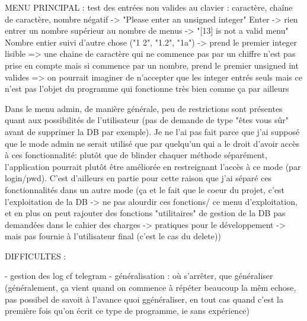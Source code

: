 \documentclass{article}
\begin{document}
MENU PRINCIPAL :
    test des entrées non valides au clavier : caractère, chaîne de caractère, nombre négatif -> "Please enter an unsigned integer"
    Enter -> rien
    entrer un nombre supérieur au nombre de menus -> "[13] is not a valid menu"
    Nombre entier suivi d'autre chose ("1 2", "1.2", "1a") -> prend le premier integer lisible
    => une chaine de caractère qui ne commence pas par un chiffre n'est pas prise en compte mais si commence par un nombre, prend le premier unsigned int valides
    => on pourrait imaginer de n'accepter que les integer entrés seuls mais ce n'est pas l'objet du programme qui fonctionne très bien comme ça par ailleurs

    Dans le menu admin, de manière générale, peu de restrictions sont présentes quant aux possibilités de l'utilisateur (pas de demande de type "êtes vous sûr" avant de supprimer la DB par exemple).
    Je ne l'ai pas fait parce que j'ai supposé que le mode admin ne serait utilisé que par quelqu'un qui a le droit d'avoir accès à ces fonctionnalité: plutôt que de blinder chaquer méthode séparément, l'application pourrait plutôt être améliorée en restreignant l'accès à ce mode (par login/pwd). C'est d'ailleurs en partie pour cette raison que j'ai séparé ces fonctionnalités dans un autre mode (ça et le fait que le coeur du projet, c'est l'exploitation de la DB -> ne pas alourdir ces fonctions/ ce menu d'exploitation, et en plus on peut rajouter des fonctions "utilitaires" de gestion de la DB pas demandées dans le cahier des charges -> pratiques pour le développement -> mais pas fournie à l'utilisateur final (c'est le cas du delete))


    DIFFICULTES :

    - gestion des log cf telegram
    - généralisation : où s'arrêter, que généraliser (généralement, ça vient quand on commence à répéter beaucoup la mêm echose, pas possibel de savoit à l'avance quoi ggénéraliser, en tout cas quand c'est la première fois qu'on écrit ce type de programme, ie sans expérience)

    
\end{document}
